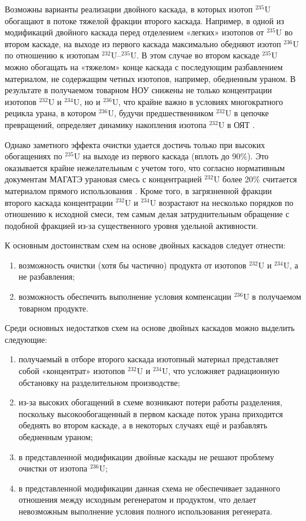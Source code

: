 Возможны варианты реализации двойного каскада, в которых изотоп $^{235}$U обогащают в потоке тяжелой фракции второго каскада. Например, в одной из модификаций двойного каскада перед отделением «легких» изотопов от $^{235}$U во втором каскаде, на выходе из первого каскада максимально обедняют изотоп $^{236}$U по отношению к изотопам $^{232}$U–$^{235}$U. В этом случае во втором каскаде $^{235}$U можно обогащать на «тяжелом» конце каскада с последующим разбавлением материалом, не содержащим четных изотопов, например, обедненным ураном. В результате в получаемом товарном НОУ снижены не только концентрации изотопов $^{232}$U и $^{234}$U, но и $^{236}$U, что крайне важно в условиях многократного рецикла урана, в котором $^{236}$U, будучи предшественником $^{232}$U в цепочке превращений, определяет динамику накопления изотопа $^{232}$U в ОЯТ \cite{smirnovEvolutionIsotopicComposition2012}.

Однако заметного эффекта очистки удается достичь только при высоких обогащениях по $^{235}$U на выходе из первого каскада (вплоть до 90\%). Это оказывается крайне нежелательным с учетом того, что согласно нормативным документам МАГАТЭ урановая смесь с концентрацией $^{232}$U более 20\% считается материалом прямого использования \cite{ManagementHighEnriched2005}. Кроме того, в загрязненной фракции второго каскада концентрации $^{232}$U и $^{234}$U возрастают на несколько порядков по отношению к исходной смеси, тем самым делая затруднительным обращение с подобной фракцией из-за существенного уровня удельной активности.

К основным достоинствам схем на основе двойных каскадов следует отнести:

\begin{enumerate}
  \item	возможность очистки (хотя бы частично) продукта от изотопов $^{232}$U и $^{234}$U, а не разбавления; 
  \item	возможность обеспечить выполнение условия компенсации $^{236}$U в получаемом товарном продукте.
\end{enumerate}

Среди основных недостатков схем на основе двойных каскадов можно выделить следующие: 
\begin{enumerate}
  \item	получаемый в отборе второго каскада изотопный материал представляет собой «концентрат» изотопов $^{232}$U и $^{234}$U, что усложняет радиационную обстановку на разделительном производстве; 
  \item	из-за высоких обогащений в схеме возникают потери работы разделения, поскольку высокообогащенный в первом каскаде поток урана приходится обеднять во втором каскаде, а в некоторых случаях ещё и разбавлять обедненным ураном;
  \item	в представленной модификации двойные каскады не решают проблему очистки от изотопа $^{236}$U;
  \item в представленной модификации данная схема не обеспечивает заданного отношения между исходным регенератом и продуктом, что делает невозможным выполнение условия полного использования регенерата.
\end{enumerate}

